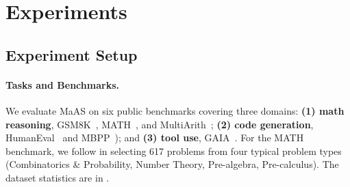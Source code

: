 \documentclass{article}
\theoremstyle{plain}
\theoremstyle{definition}
\theoremstyle{remark}
\newcommand{\ourmethod}{{{MaAS}}\xspace}
\begin{document}
\section{Experiments}



\vspace{-0.6em}
\subsection{Experiment Setup}\label{sec:exp-setup}
\vspace{-0.4em}
\paragraph{Tasks and Benchmarks.} We evaluate \ourmethod on six public benchmarks covering three domains: \textbf{(1) math reasoning}, GSM8K~\citep{gsm8k}, MATH~\citep{hendrycksmath2021}, and MultiArith~\cite{roy2016solving};  \textbf{(2) code generation}, HumanEval~\citep{human-eval} and MBPP~\citep{austin2021mbpp}); and \textbf{(3) tool use}, GAIA~\citep{mialon2023gaiabenchmark}. For the MATH benchmark, we follow \cite{hong2024datainterpreter} in selecting 617 problems from four typical problem types (Combinatorics \& Probability, Number Theory, Pre-algebra, Pre-calculus). The dataset statistics are in .
\vspace{-0.8em}
\end{document}
